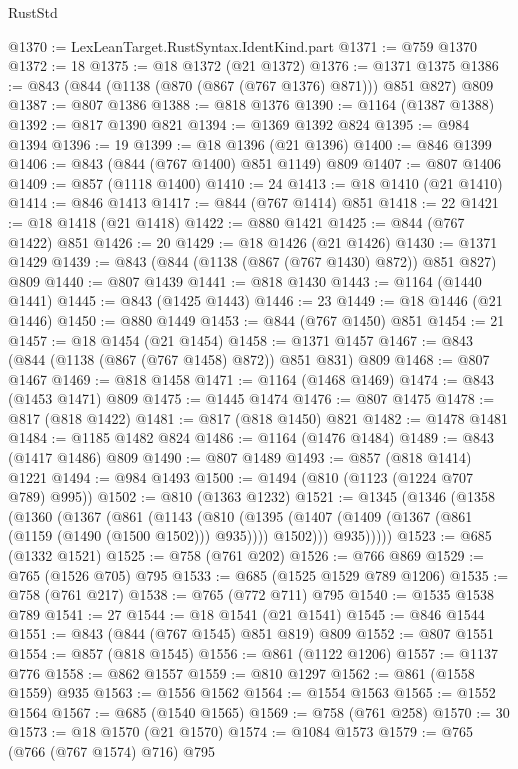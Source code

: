 \begin{lexlean}{RustStd}
\begin{coremodule}
@1370 := LexLeanTarget.RustSyntax.IdentKind.part
@1371 := @759 @1370
@1372 := 18
@1375 := @18 @1372 (@21 @1372)
@1376 := @1371 @1375
@1386 := @843 (@844 (@1138 (@870 (@867 (@767 @1376) @871))) @851 @827) @809
@1387 := @807 @1386
@1388 := @818 @1376
@1390 := @1164 (@1387 @1388)
@1392 := @817 @1390 @821
@1394 := @1369 @1392 @824
@1395 := @984 @1394
@1396 := 19
@1399 := @18 @1396 (@21 @1396)
@1400 := @846 @1399
@1406 := @843 (@844 (@767 @1400) @851 @1149) @809
@1407 := @807 @1406
@1409 := @857 (@1118 @1400)
@1410 := 24
@1413 := @18 @1410 (@21 @1410)
@1414 := @846 @1413
@1417 := @844 (@767 @1414) @851
@1418 := 22
@1421 := @18 @1418 (@21 @1418)
@1422 := @880 @1421
@1425 := @844 (@767 @1422) @851
@1426 := 20
@1429 := @18 @1426 (@21 @1426)
@1430 := @1371 @1429
@1439 := @843 (@844 (@1138 (@867 (@767 @1430) @872)) @851 @827) @809
@1440 := @807 @1439
@1441 := @818 @1430
@1443 := @1164 (@1440 @1441)
@1445 := @843 (@1425 @1443)
@1446 := 23
@1449 := @18 @1446 (@21 @1446)
@1450 := @880 @1449
@1453 := @844 (@767 @1450) @851
@1454 := 21
@1457 := @18 @1454 (@21 @1454)
@1458 := @1371 @1457
@1467 := @843 (@844 (@1138 (@867 (@767 @1458) @872)) @851 @831) @809
@1468 := @807 @1467
@1469 := @818 @1458
@1471 := @1164 (@1468 @1469)
@1474 := @843 (@1453 @1471) @809
@1475 := @1445 @1474
@1476 := @807 @1475
@1478 := @817 (@818 @1422)
@1481 := @817 (@818 @1450) @821
@1482 := @1478 @1481
@1484 := @1185 @1482 @824
@1486 := @1164 (@1476 @1484)
@1489 := @843 (@1417 @1486) @809
@1490 := @807 @1489
@1493 := @857 (@818 @1414) @1221
@1494 := @984 @1493
@1500 := @1494 (@810 (@1123 (@1224 @707 @789) @995))
@1502 := @810 (@1363 @1232)
@1521 := @1345
    (@1346
      (@1358
        (@1360
          (@1367
            (@861
              (@1143
                (@810
                  (@1395 (@1407 (@1409 (@1367 (@861 (@1159 (@1490 (@1500 @1502))) @935)))) @1502)))
              @935)))))
@1523 := @685 (@1332 @1521)
@1525 := @758 (@761 @202)
@1526 := @766 @869
@1529 := @765 (@1526 @705) @795
@1533 := @685 (@1525 @1529 @789 @1206)
@1535 := @758 (@761 @217)
@1538 := @765 (@772 @711) @795
@1540 := @1535 @1538 @789
@1541 := 27
@1544 := @18 @1541 (@21 @1541)
@1545 := @846 @1544
@1551 := @843 (@844 (@767 @1545) @851 @819) @809
@1552 := @807 @1551
@1554 := @857 (@818 @1545)
@1556 := @861 (@1122 @1206)
@1557 := @1137 @776
@1558 := @862 @1557
@1559 := @810 @1297
@1562 := @861 (@1558 @1559) @935
@1563 := @1556 @1562
@1564 := @1554 @1563
@1565 := @1552 @1564
@1567 := @685 (@1540 @1565)
@1569 := @758 (@761 @258)
@1570 := 30
@1573 := @18 @1570 (@21 @1570)
@1574 := @1084 @1573
@1579 := @765 (@766 (@767 @1574) @716) @795

\end{coremodule}
\end{lexlean}
